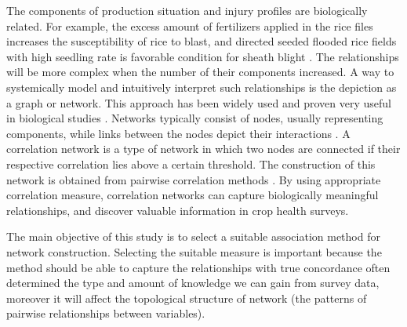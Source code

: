 \documentclass[a4paper]{article}
\begin{document}

The components of production situation and injury profiles are biologically related. For example, the excess amount of fertilizers applied in the rice files increases the susceptibility of rice to blast, and directed seeded flooded rice fields with high seedling rate is favorable condition for sheath blight \citep{ouricedisease}. The relationships will be more complex when the number of their components increased. A way to systemically model and intuitively interpret such relationships is the depiction as a graph or network. This approach has been widely used and proven very useful in biological studies \citep{Lefebvre:2011fo}. Networks typically consist of nodes, usually representing components, while links between the nodes depict their interactions \citep{PROULX:2005hx}. A correlation network is a type of network in which two nodes are connected if their respective correlation lies above a certain threshold. The construction of this network is obtained from pairwise correlation methods \citep{Toubiana:2013cv}. By using appropriate correlation measure, correlation networks can capture biologically meaningful relationships, and discover valuable information in crop health surveys.

The main objective of this study is to select a suitable association method for network construction. Selecting the suitable measure is important because the method should be able to capture the relationships with true concordance often determined the type and amount of knowledge we can gain from survey data, moreover it will affect the topological structure of network (the patterns of pairwise relationships between variables).
\end{document}

